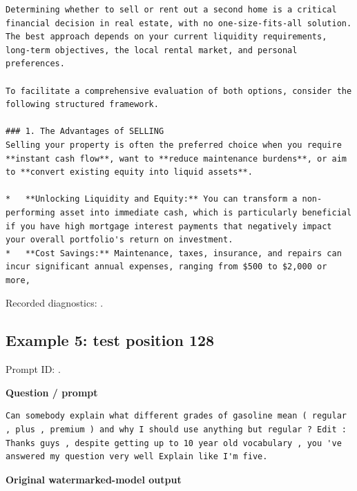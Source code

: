 \begin{Verbatim}
Determining whether to sell or rent out a second home is a critical financial decision in real estate, with no one-size-fits-all solution. The best approach depends on your current liquidity requirements, long-term objectives, the local rental market, and personal preferences.

To facilitate a comprehensive evaluation of both options, consider the following structured framework.

### 1. The Advantages of SELLING
Selling your property is often the preferred choice when you require **instant cash flow**, want to **reduce maintenance burdens**, or aim to **convert existing equity into liquid assets**.

*   **Unlocking Liquidity and Equity:** You can transform a non-performing asset into immediate cash, which is particularly beneficial if you have high mortgage interest payments that negatively impact your overall portfolio's return on investment.
*   **Cost Savings:** Maintenance, taxes, insurance, and repairs can incur significant annual expenses, ranging from $500 to $2,000 or more,
\end{Verbatim}

Recorded diagnostics:
\texttt{}.

\subsection{Example 5: test position
128}\label{record-docs-watermarking-qualitative-text-textseal2-vanilla-md-example-5-test-position-128}

Prompt ID:
\texttt{}.

\textbf{Question / prompt}

\begin{Verbatim}
Can somebody explain what different grades of gasoline mean ( regular , plus , premium ) and why I should use anything but regular ? Edit : Thanks guys , despite getting up to 10 year old vocabulary , you 've answered my question very well Explain like I'm five.
\end{Verbatim}

\textbf{Original watermarked-model output}

